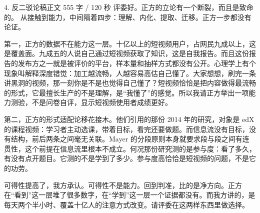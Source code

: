 \documentclass[script,con]{debate}
\begin{document}
\begin{speech}{4. 反二驳论稿}{正文 555 字 / 120 秒}
评委好。正方的立论有一个断裂，而且是致命的。 从接触到能力，中间隔着四步：理解、内化、提取、迁移。正方一步都没有论证。

第一，正方的数据不在能力这一层。十亿以上的短视频用户，占网民九成以上，这是覆盖面。九成五的人说自己通过短视频获取了知识，这是自我报告。而且这份报告的发布方之一就是被评价的平台，样本量和抽样方式都没有公开。心理学上有个现象叫解释深度错觉：加工越流畅，人越容易高估自己懂了。大家想想，刷完一条讲黑洞的视频，那一刻你是不是也觉得自己懂了？短视频恰恰是把内容做得最流畅的形式，它最擅长生产的不是理解，是“我懂了”的感觉。所以我请正方举出一项能力测验，不是问卷自评，显示短视频使用者成绩更好。

第二，正方的形式适配论移花接木。他们引用的那份 2014 年的研究，对象是 edX 的课程视频：学习者主动选课，带着目标，看完还要做题。而信息流没有目标，没有结构，前后两条之间毫无关联。Mayer 的分段原则本身就要求段与段之间有连贯性，这个前提在信息流里根本不成立。何况那份研究测的是参与度：看了多久，有没有点开题目。它测的不是学到了多少。参与度高恰恰是短视频的问题，不是它的功劳。

可得性提高了，我方承认。可得性不是能力。回到判准，比的是净方向。正方在“看到”这一层堆了很多数字，在“学到”这一层一个证据都没有。而我方讲的，是每天两个半小时、覆盖十亿人的注意方式改变。请评委在这两样东西里做选择。

\begin{contingency}
\end{contingency}
\end{speech}
\end{document}
